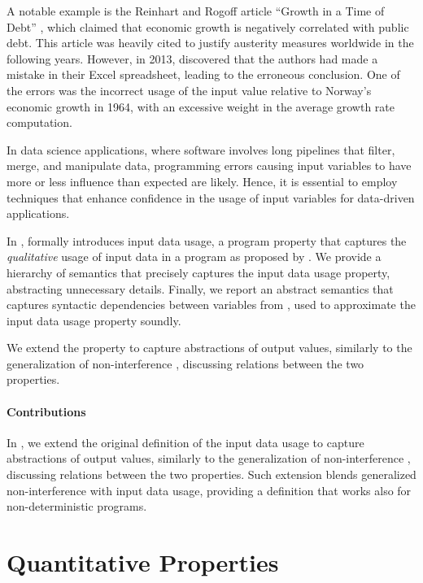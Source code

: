 A notable example is the Reinhart and Rogoff article “Growth in a Time of Debt” , which claimed that economic growth is negatively correlated with public debt.
This article was heavily cited to justify austerity measures worldwide in the following years.
However, in 2013,  discovered that the authors had made a mistake in their Excel spreadsheet, leading to the erroneous conclusion.
One of the errors was the incorrect usage of the input value relative to Norway's economic growth in 1964, with an excessive weight in the average growth rate computation.

In data science applications, where software involves long pipelines that filter, merge, and manipulate data, programming errors causing input variables to have more or less influence than expected are likely.
Hence, it is essential to employ techniques that enhance confidence in the usage of input variables for data-driven applications.


In ,  formally introduces input data usage, a program property that captures the \emph{qualitative} usage of input data in a program as proposed by .
We provide a hierarchy of semantics that precisely captures the input data usage property, abstracting unnecessary details.
Finally, we report an abstract semantics that captures syntactic dependencies between variables from , used to approximate the input data usage property soundly.

We extend the property to capture abstractions of output values, similarly to the generalization of non-interference , discussing relations between the two properties.

\paragraph{Contributions}

In , we extend the original definition of the input data usage to capture abstractions of output values, similarly to the generalization of non-interference , discussing relations between the two properties.
Such extension blends generalized non-interference with input data usage, providing a definition that works also for non-deterministic programs.


\section{Quantitative Properties}

